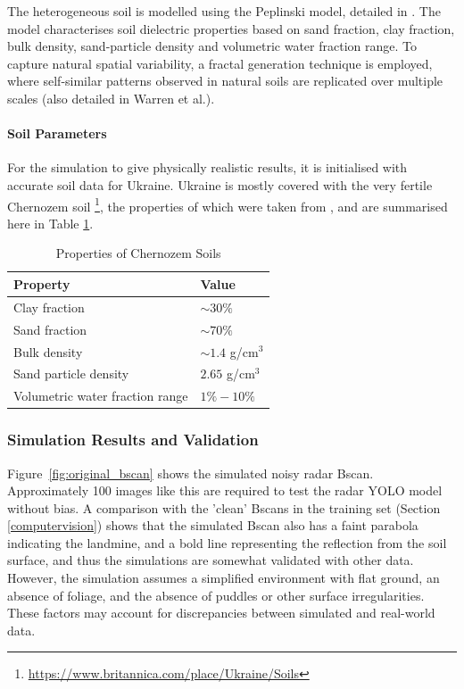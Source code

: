         \noindent The heterogeneous soil is modelled using the Peplinski model, detailed in \cite{warren2016gprmax}. The model characterises soil dielectric properties based on sand fraction, clay fraction, bulk density, sand-particle density and volumetric water fraction range. To capture natural spatial variability, a fractal generation technique is employed, where self-similar patterns observed in natural soils are replicated over multiple scales (also detailed in Warren et al.).

        \paragraph{Soil Parameters}

            For the simulation to give physically realistic results, it is initialised with accurate soil data for Ukraine. Ukraine is mostly covered with the very fertile Chernozem soil \footnote{\url{https://www.britannica.com/place/Ukraine/Soils}}, the properties of which were taken from \cite{suleymanov2021chernozem}, and are summarised here in Table \ref{tab:chernozem}.

            \begin{table}[htbp]
              \centering
              \caption{Properties of Chernozem Soils}
              \begin{tabular}{@{} l l @{}} 
                \toprule
                \textbf{Property} & \textbf{Value} \\
                \midrule
                Clay fraction & $\sim 30\%$ \\
                Sand fraction & $\sim 70\%$ \\
                Bulk density & $\sim 1.4$ g/cm$^3$ \\
                Sand particle density & $2.65$ g/cm$^3$ \\
                Volumetric water fraction range & $1\% - 10\%$ \\
                \bottomrule
              \end{tabular}
              \label{tab:chernozem}
            \end{table}
    

    
    \subsubsection{Simulation Results and Validation}

        \noindent Figure~\ref{fig:original_bscan} shows the simulated noisy radar Bscan. Approximately 100 images like this are required to test the radar YOLO model without bias. A comparison with the 'clean' Bscans in the training set (Section \ref{computervision}) shows that the simulated Bscan also has a faint parabola indicating the landmine, and a bold line representing the reflection from the soil surface, and thus the simulations are somewhat validated with other data. However, the simulation assumes a simplified environment with flat ground, an absence of foliage, and the absence of puddles or other surface irregularities. These factors may account for discrepancies between simulated and real-world data.

